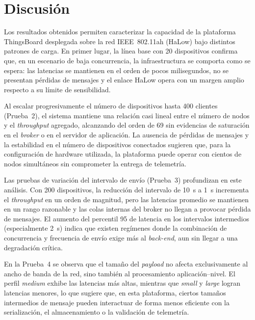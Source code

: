 \section{Discusi\'on}
Los resultados obtenidos permiten caracterizar la capacidad de la plataforma ThingsBoard desplegada sobre la red IEEE~802.11ah (HaLow) bajo distintos patrones de carga. En primer lugar, la l\'inea base con \num{20} dispositivos confirma que, en un escenario de baja concurrencia, la infraestructura se comporta como se espera: las latencias se mantienen en el orden de pocos milisegundos, no se presentan p\'erdidas de mensajes y el enlace HaLow opera con un margen amplio respecto a su l\'imite de sensibilidad.

Al escalar progresivamente el n\'umero de dispositivos hasta \num{400} clientes (Prueba~2), el sistema mantiene una relaci\'on casi lineal entre el n\'umero de nodos y el \emph{throughput} agregado, alcanzando del orden de \SI{69}{} sin evidencias de saturaci\'on en el \emph{broker} o en el servidor de aplicaci\'on. La ausencia de p\'erdidas de mensajes y la estabilidad en el n\'umero de dispositivos conectados sugieren que, para la configuraci\'on de hardware utilizada, la plataforma puede operar con cientos de nodos simult\'aneos sin comprometer la entrega de telemetr\'ia.

Las pruebas de variaci\'on del intervalo de env\'io (Prueba~3) profundizan en este an\'alisis. Con \num{200} dispositivos, la reducci\'on del intervalo de \SI{10}{\second} a \SI{1}{\second} incrementa el \emph{throughput} en un orden de magnitud, pero las latencias promedio se mantienen en un rango razonable y las colas internas del broker no llegan a provocar p\'erdida de mensajes. El aumento del percentil 95 de latencia en los intervalos intermedios (especialmente \SI{2}{\second}) indica que existen reg\'imenes donde la combinaci\'on de concurrencia y frecuencia de env\'io exige m\'as al \emph{back-end}, aun sin llegar a una degradaci\'on cr\'itica.

En la Prueba~4 se observa que el tama\~no del \emph{payload} no afecta exclusivamente al ancho de banda de la red, sino tambi\'en al procesamiento aplicaci\'on--nivel. El perfil \textit{medium} exhibe las latencias m\'as altas, mientras que \textit{small} y \textit{large} logran latencias menores, lo que sugiere que, en esta plataforma, ciertos tamaños intermedios de mensaje pueden interactuar de forma menos eficiente con la serializaci\'on, el almacenamiento o la validaci\'on de telemetr\'ia.

